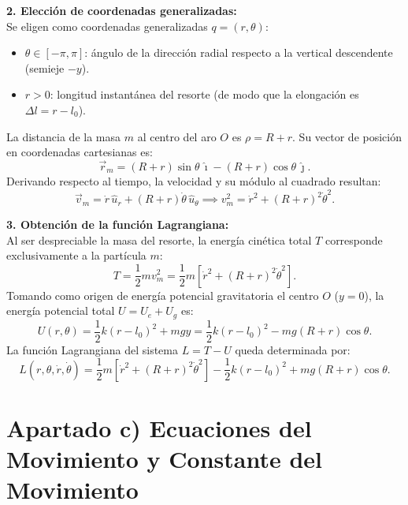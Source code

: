 \documentclass[11pt,a4paper]{article}
\begin{document}
\textbf{2. Elección de coordenadas generalizadas:}\\
Se eligen como coordenadas generalizadas $q = (r, \theta)$:
\begin{itemize}
    \item $\theta \in [-\pi, \pi]$: ángulo de la dirección radial respecto a la vertical descendente (semieje $-y$).
    \item $r > 0$: longitud instantánea del resorte (de modo que la elongación es $\Delta l = r - l_0$).
\end{itemize}
La distancia de la masa $m$ al centro del aro $O$ es $\rho = R + r$. Su vector de posición en coordenadas cartesianas es:
\begin{equation}
\vec{r}_m = (R + r)\sin\theta\,\hat{\imath} - (R + r)\cos\theta\,\hat{\jmath}.
\end{equation}
Derivando respecto al tiempo, la velocidad y su módulo al cuadrado resultan:
\begin{equation}
\vec{v}_m = \dot{r}\,\hat{u}_r + (R + r)\dot{\theta}\,\hat{u}_\theta \implies v_m^2 = \dot{r}^2 + (R + r)^2\dot{\theta}^2.
\end{equation}

\textbf{3. Obtención de la función Lagrangiana:}\\
Al ser despreciable la masa del resorte, la energía cinética total $T$ corresponde exclusivamente a la partícula $m$:
\begin{equation}
T = \frac{1}{2}m v_m^2 = \frac{1}{2}m\left[ \dot{r}^2 + (R + r)^2\dot{\theta}^2 \right].
\end{equation}
Tomando como origen de energía potencial gravitatoria el centro $O$ ($y = 0$), la energía potencial total $U = U_e + U_g$ es:
\begin{equation}
U(r, \theta) = \frac{1}{2}k(r - l_0)^2 + mgy = \frac{1}{2}k(r - l_0)^2 - mg(R + r)\cos\theta.
\end{equation}
La función Lagrangiana del sistema $L = T - U$ queda determinada por:
\begin{equation}
\boxed{L(r, \theta, \dot{r}, \dot{\theta}) = \frac{1}{2}m\left[ \dot{r}^2 + (R + r)^2\dot{\theta}^2 \right] - \frac{1}{2}k(r - l_0)^2 + mg(R + r)\cos\theta.}
\end{equation}

\section*{Apartado c) Ecuaciones del Movimiento y Constante del Movimiento}
\end{document}
